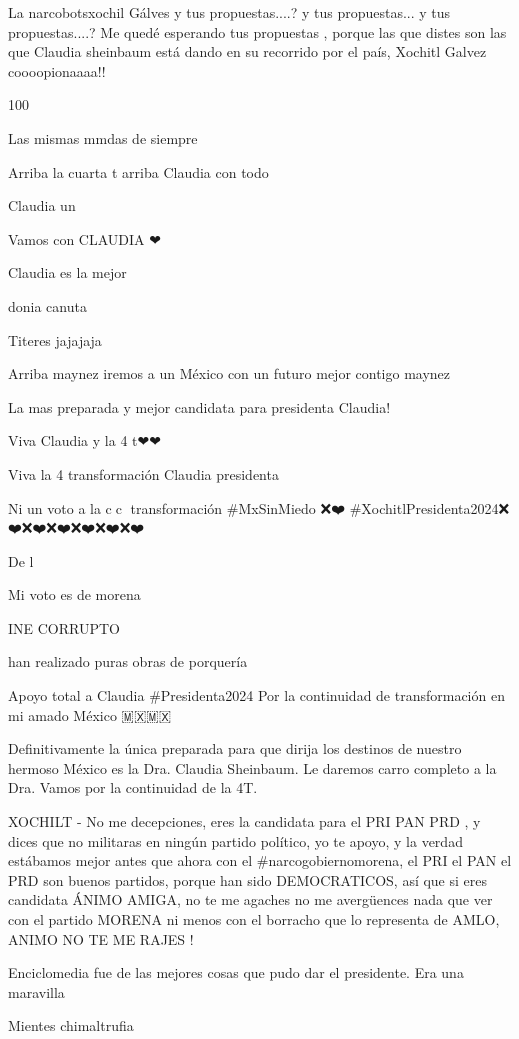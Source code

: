 La narcobotsxochil Gálves y tus propuestas....?  y tus propuestas...  y tus propuestas....?  Me quedé esperando tus propuestas , porque las que distes son las que Claudia sheinbaum está dando en su recorrido por el país, Xochitl Galvez coooopionaaaa!!

100%

Las mismas mmdas de siempre

Arriba la cuarta t arriba  Claudia con todo

Claudia un 💯

Vamos con CLAUDIA ❤

Claudia es la mejor

donia canuta

Titeres jajajaja

Arriba maynez iremos a un México con un futuro mejor contigo maynez🍊🍊🧡🧡🧡🧡🧡

La mas preparada y mejor candidata para presidenta Claudia!

Viva Claudia y la 4 t❤❤

Viva la 4 transformación Claudia presidenta

Ni un voto a la c💩c💩  transformación 
#MxSinMiedo ❌❤️ #XochitlPresidenta2024❌️❤️❌️❤️❌️❤️❌️❤️❌️❤️❌️❤️

De l

Mi voto es de morena

INE CORRUPTO

han realizado puras obras de porquería

Apoyo total a Claudia #Presidenta2024
Por la continuidad de transformación en mi amado México 🇲🇽🇲🇽🔔🔔🎺

Definitivamente la única preparada para que dirija los destinos de nuestro hermoso México es la Dra. Claudia Sheinbaum. Le daremos carro completo a la Dra. Vamos por la continuidad de la 4T. 💪💪💪💪

XOCHILT - No me decepciones, eres la candidata para el PRI PAN PRD , y dices que no militaras en ningún partido político, yo te apoyo, y la verdad estábamos mejor antes que ahora con el #narcogobiernomorena, el PRI el PAN el PRD son buenos partidos, porque han sido DEMOCRATICOS, así que si eres candidata ÁNIMO AMIGA, no te me agaches no me avergüences nada que ver con el partido MORENA ni menos con el borracho que lo representa de AMLO,  ANIMO NO TE ME RAJES !

Enciclomedia fue de las mejores cosas que pudo dar el presidente. Era una maravilla

Mientes chimaltrufia

